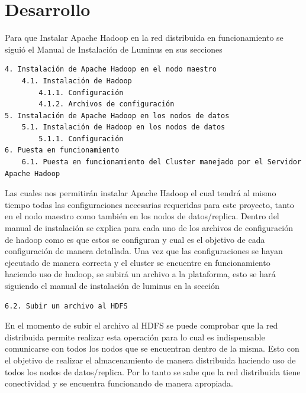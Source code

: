 \section{Desarrollo}\label{seccion5}
Para que Instalar Apache Hadoop en la red distribuida en funcionamiento se siguió el Manual de Instalación de Luminus 
en sus secciones 
\begin{verbatim}
4. Instalación de Apache Hadoop en el nodo maestro
	4.1. Instalación de Hadoop 
		4.1.1. Configuración
		4.1.2. Archivos de configuración
5. Instalación de Apache Hadoop en los nodos de datos
	5.1. Instalación de Hadoop en los nodos de datos 
		5.1.1. Configuración 
6. Puesta en funcionamiento
	6.1. Puesta en funcionamiento del Cluster manejado por el Servidor Apache Hadoop
\end{verbatim}
Las cuales nos permitirán instalar Apache Hadoop el cual tendrá al mismo tiempo todas las configuraciones necesarias
requeridas para este proyecto, tanto en el nodo maestro como también en los nodos de datos/replica.
Dentro del manual de instalación se explica para cada uno de los archivos de configuración de hadoop como es que
estos se configuran y cual es el objetivo de cada configuración de manera detallada.
Una vez que las configuraciones se hayan ejecutado de manera correcta y el cluster se encuentre en funcionamiento
haciendo uso de hadoop, se subirá un archivo a la plataforma, esto se hará siguiendo el manual de instalación de luminus
en la sección
\begin{verbatim}
6.2. Subir un archivo al HDFS
\end{verbatim}
En el momento de subir el archivo al HDFS se puede comprobar que la red distribuida permite realizar esta operación
para lo cual es indispensable comunicarse con todos los nodos que se encuentran dentro de la misma. Esto con el
objetivo de realizar el almacenamiento de manera distribuida haciendo uso de todos los nodos de datos/replica. Por lo
tanto se sabe que la red distribuida tiene conectividad y se encuentra funcionando de manera apropiada.
